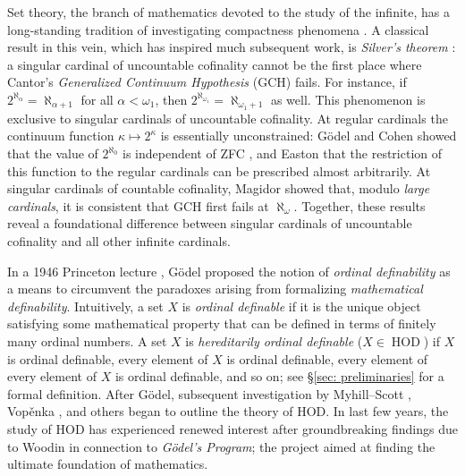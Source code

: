 \documentclass[11pt]{amsart}
\theoremstyle{definition}
\theoremstyle{remark}
\DeclareMathOperator{\HOD}{HOD}
\begin{document}
\smallskip
 
Set theory, the branch of mathematics devoted to the study of the infinite, has a
long-standing tradition of investigating compactness phenomena
\cite{MitchellAronszajn,MagRefl,MR924672,CumFor,CFM,PartIII,GolPov,%
JakobPoveda,BenhamouSinapova,HayutPoveda}.
A classical result in this vein, which has inspired much subsequent work, is
\emph{Silver's theorem} \cite{MR0429564}: a singular cardinal of uncountable cofinality
cannot be the first place where Cantor's \emph{Generalized Continuum Hypothesis} (GCH)
fails. For instance, if $2^{\aleph_\alpha}=\aleph_{\alpha+1}$ for all $\alpha<\omega_1$,
then $2^{\aleph_{\omega_1}}=\aleph_{\omega_1+1}$ as well.
This phenomenon is exclusive to singular cardinals of uncountable cofinality. At regular cardinals the continuum function $\kappa\mapsto2^{\kappa}$
is essentially unconstrained: Gödel \cite{GodelL} and Cohen showed that the value of $2^{\aleph_0}$ is independent
of ZFC \cite{cohen1,cohen2}, and Easton \cite{Easton} that the restriction of this function
to the regular cardinals can be prescribed almost arbitrarily. At singular cardinals of
countable cofinality, Magidor \cite{MagSingII} showed that,
modulo \emph{large cardinals}, it is consistent that GCH first fails at $\aleph_\omega$.
Together, these results reveal a foundational difference between singular cardinals of
uncountable cofinality and all other infinite cardinals.


 
 \smallskip
 
 
 
 In a 1946 Princeton lecture \cite{Godel}, G\"odel proposed the notion of \emph{ordinal definability} as a means to circumvent the paradoxes arising from formalizing \emph{mathematical definability}. Intuitively, a set $X$ is \emph{ordinal definable} if it is the unique object satisfying some mathematical property that can be defined in terms of finitely many ordinal numbers. A set $X$ is \emph{hereditarily ordinal definable} ($X\in \HOD$) if $X$ is ordinal definable, every element of $X$ is ordinal definable, every element of every element of $X$ is ordinal definable, and so on; see \S\ref{sec: preliminaries} for a  formal definition. After Gödel, subsequent investigation by %
Myhill--Scott \cite{Myhill}, Vop\v{e}nka \cite{Vopenka}, and others began to outline the theory of HOD. %
In last few years, the study of HOD has experienced renewed interest after groundbreaking findings due to  Woodin \cite{WooPartI,WoodinPartII,midrasha,BKW} in connection to \emph{Gödel's Program}; the project aimed at finding the ultimate foundation of mathematics.
 
\end{document}
